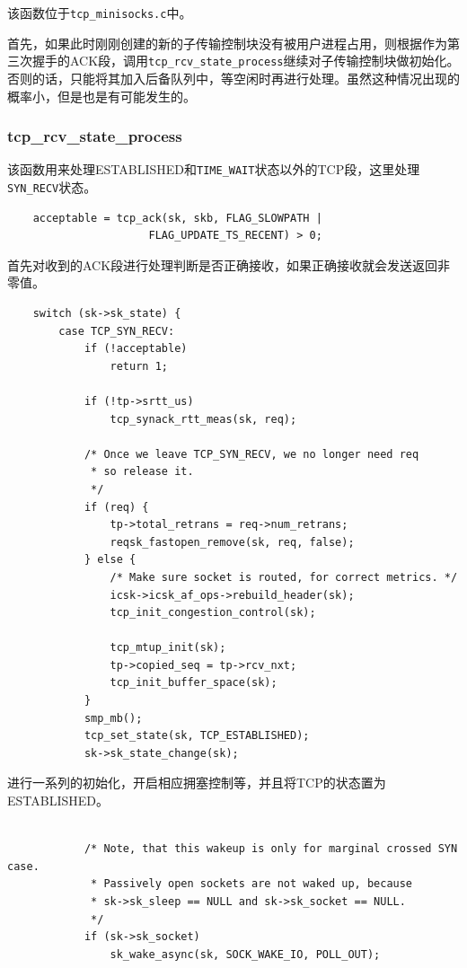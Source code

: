                 该函数位于\texttt{tcp_minisocks.c}中。

                首先，如果此时刚刚创建的新的子传输控制块没有被用户进程占用，则根据作为第三次握手的ACK段，调用\texttt{tcp_rcv_state_process}继续对子传输控制块做初始化。否则的话，只能将其加入后备队列中，等空闲时再进行处理。虽然这种情况出现的概率小，但是也是有可能发生的。

                \subsubsection{tcp\_rcv\_state\_process}

                    该函数用来处理ESTABLISHED和\texttt{TIME_WAIT}状态以外的TCP段，这里处理\texttt{SYN_RECV}状态。
\begin{verbatim}
    acceptable = tcp_ack(sk, skb, FLAG_SLOWPATH |
                      FLAG_UPDATE_TS_RECENT) > 0;
\end{verbatim}

                    首先对收到的ACK段进行处理判断是否正确接收，如果正确接收就会发送返回非零值。

\begin{verbatim}
    switch (sk->sk_state) {
        case TCP_SYN_RECV:
            if (!acceptable)
                return 1;

            if (!tp->srtt_us)
                tcp_synack_rtt_meas(sk, req);

            /* Once we leave TCP_SYN_RECV, we no longer need req
             * so release it.
             */
            if (req) {
                tp->total_retrans = req->num_retrans;
                reqsk_fastopen_remove(sk, req, false);
            } else {
                /* Make sure socket is routed, for correct metrics. */
                icsk->icsk_af_ops->rebuild_header(sk);
                tcp_init_congestion_control(sk);

                tcp_mtup_init(sk);
                tp->copied_seq = tp->rcv_nxt;
                tcp_init_buffer_space(sk);
            }
            smp_mb();
            tcp_set_state(sk, TCP_ESTABLISHED);
            sk->sk_state_change(sk);
\end{verbatim}

                    进行一系列的初始化，开启相应拥塞控制等，并且将TCP的状态置为ESTABLISHED。

\begin{verbatim}

            /* Note, that this wakeup is only for marginal crossed SYN case.
             * Passively open sockets are not waked up, because
             * sk->sk_sleep == NULL and sk->sk_socket == NULL.
             */
            if (sk->sk_socket)
                sk_wake_async(sk, SOCK_WAKE_IO, POLL_OUT);
\end{verbatim}

